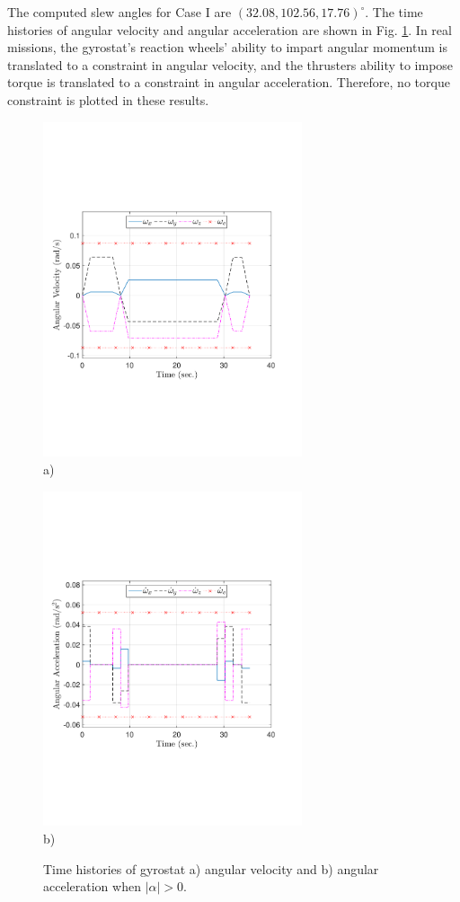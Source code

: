 \documentclass[journal ]{new-aiaa}
\begin{document}
The computed slew angles for Case I are $(32.08, 102.56, 17.76)^\circ$. The time histories of angular velocity and angular acceleration are shown in Fig. \ref{fig:ang_vel_acc}. In real missions, the gyrostat's reaction wheels' ability to impart angular momentum is translated to a constraint in angular velocity, and the thrusters ability to impose torque is translated to a constraint in angular acceleration. Therefore, no torque constraint is plotted in these results.
\begin{figure}[hbt!]
    \centering
    \begin{minipage}{.5\textwidth}
        \centering
    \includegraphics[width=3in]{total_angular_velocity.pdf}
    	\\ a) 

    \end{minipage}%
    \begin{minipage}{0.5\textwidth}
        \centering
        \includegraphics[width=3in]{total_angular_acceleration.pdf}
       \\ b) 
    \end{minipage}
    \caption{Time histories of gyrostat a) angular velocity and b) angular acceleration when $|\alpha|>0$.}
    \label{fig:ang_vel_acc} 
\end{figure}
\end{document}
